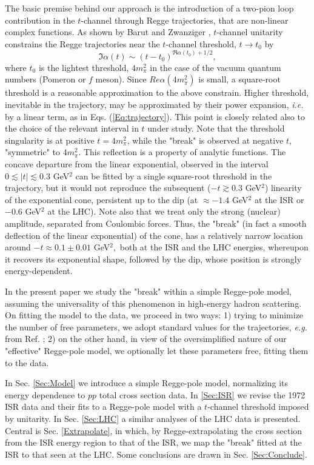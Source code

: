 \documentclass[aps,prd,superscriptaddress,showpacs,preprintnumbers]{revtex4}
\begin{document}
The basic premise behind our approach is the introduction of a two-pion loop contribution in the $t$-channel through Regge trajectories, that are non-linear complex functions. As shown by Barut and Zwanziger \cite{Barut}, $t$-channel unitarity constrains the Regge trajectories near the $t$-channel threshold, $t\rightarrow t_0$ by
\begin{equation} \label{Eq:Barut}
\Im \alpha(t)\sim (t-t_0)^{\Re\alpha(t_0)+1/2},
\end{equation} 
where $t_0$ is the lightest threshold, $4m_{\pi}^2$ in the case of the vacuum quantum numbers (Pomeron or $f$ meson). Since $Re\alpha(4m_{\pi}^2)$ is small, a square-root threshold is a reasonable approximation to the above constrain. Higher threshold, inevitable in the trajectory, may be approximated by their power expansion, {\it i.e.} by a linear term, as in 
Eqs. (\ref{Eq:trajectory}). This point is closely related also to the choice of the relevant interval in $t$ under study. Note that the threshold singularity is at positive $t=4m_{\pi}^2$, while the "break" is observed at negative $t$, "symmetric" to $4m_{\pi}^2$. This reflection is a property of analytic functions. The concave departure from the linear exponential, observed in the interval $0 \lesssim |t|\lesssim 0.3$ GeV$^2$ can be fitted by a single square-root threshold in the trajectory, but it would not reproduce the subsequent ($-t\gtrsim 0.3$ GeV$^2$) linearity of the exponential cone, persistent up to the dip (at $\approx -1.4$ GeV$^2$ at the ISR or $-0.6$ GeV$^2$ at the LHC). Note also that we treat only the strong (nuclear) amplitude, separated from Coulombic forces.
Thus, the "break" (in fact a smooth deflection of the linear exponential) of the cone, has a relatively narrow location around $-t \approx 0.1 \pm 0.01$ GeV$^2,$ both at the ISR and the LHC energies, whereupon it recovers its exponential shape, followed by the dip, whose position is strongly energy-dependent. 

In the present paper we study the "break" within a simple Regge-pole model, assuming the universality of this phenomenon in high-energy hadron scattering. On fitting the model to the data, we proceed in two ways: 1) trying to minimize the number of free parameters, we adopt standard values for the trajectories, {\it e.g.} from Ref. \cite{Landshoff}; 2) on the other hand, in view of the oversimplified nature of our "effective" Regge-pole model, we optionally let these parameters free, fitting them to the data.       

In Sec. \ref{Sec:Model} we introduce a simple Regge-pole model, normalizing its energy dependence to $pp$ total cross section data. In \ref{Sec:ISR} we revise the 1972 ISR data and their fits to a Regge-pole model with a $t$-channel threshold imposed by unitarity. In Sec. \ref{Sec:LHC} a similar analyses of the LHC data is presented. Central is Sec. \ref{Extrapolate}, in which, by Regge-extrapolating the cross section from the ISR energy region to that of the ISR, we map the "break" fitted at the ISR to that seen at the LHC. Some conclusions are drawn in Sec. \ref{Sec:Conclude}.      
\end{document}
